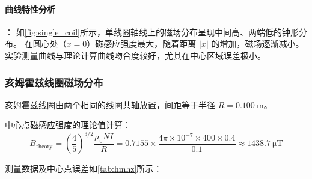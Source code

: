 \documentclass{../../templates/Report}%
\begin{document}
\begin{fullreportonly}
    \paragraph{曲线特性分析}：
    如\cref{fig:single_coil}所示，单线圈轴线上的磁场分布呈现中间高、两端低的钟形分布。
    在圆心处（$x=0$）磁感应强度最大，随着距离 $|x|$ 的增加，磁场逐渐减小。
    实验测量曲线与理论计算曲线吻合度较好，尤其在中心区域误差极小。

    \subsubsection{亥姆霍兹线圈磁场分布}
    亥姆霍兹线圈由两个相同的线圈共轴放置，间距等于半径 $R=\SI{0.100}{\meter}$。

    中心点磁感应强度的理论值计算：
    \begin{equation*}
        B_{\text{theory}} = \left(\frac{4}{5}\right)^{3/2} \frac{\mu_0 N I}{R} = 0.7155 \times \frac{4\pi \times 10^{-7} \times 400 \times 0.4}{0.1} \approx \SI{1438.7}{\micro\tesla}
    \end{equation*}

    测量数据及中心点误差如\cref{tab:hmhz}所示：


\end{fullreportonly}
\end{document}
